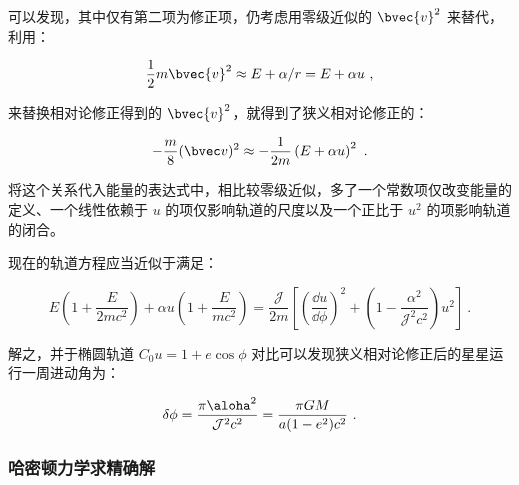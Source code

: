可以发现，其中仅有第二项为修正项，仍考虑用零级近似的 $\bvec{v}^2$ 来替代，利用：

$$\frac{1}{2} m \bvec{v}^2 \approx E + \alpha / r = E + \alpha u ~,$$

来替换相对论修正得到的 $\bvec{v}^2$，就得到了狭义相对论修正的：

\begin{equation}
-\frac{m}{8} (\bvec v)^2 \approx - \frac{1}{2m} \left(E + \alpha u\right)^2 ~.
\end{equation}

将这个关系代入能量的表达式中，相比较零级近似，多了一个常数项仅改变能量的定义、一个线性依赖于 $u$ 的项仅影响轨道的尺度以及一个正比于 $u^2$ 的项影响轨道的闭合。

现在的轨道方程应当近似于满足：

\begin{equation}
E\left(1 + \frac{E}{2mc^2}\right) + \alpha u \left(1 + \frac{E}{mc^2}\right) = \frac{\mathcal J}{2m} \left[ \left(\frac{\dd u}{\dd \phi}\right)^2 + \left( 1-\frac{\alpha^2}{\mathcal J^2 c^2} \right) u^2 \right]~.
\end{equation}

解之，并于椭圆轨道 $C_0 u = 1 + e \cos \phi$ 对比可以发现狭义相对论修正后的星星运行一周进动角为：

\begin{equation}
\delta \phi = \frac{\pi \aloha^2}{\mathcal J^2c^2} = \frac{\pi G M}{a (1-e^2) c^2} ~.
\end{equation}


\subsubsection{哈密顿力学求精确解}
